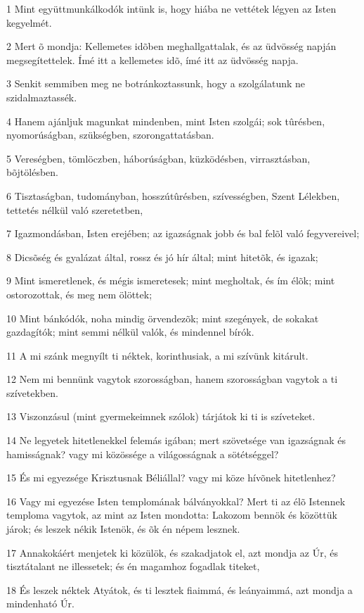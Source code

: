 \par 1 Mint együttmunkálkodók intünk  is, hogy hiába ne vettétek légyen az Isten kegyelmét.
\par 2 Mert õ mondja: Kellemetes idõben meghallgattalak, és az üdvösség napján megsegítettelek. Ímé itt a kellemetes idõ, ímé itt az üdvösség napja.
\par 3 Senkit semmiben meg ne botránkoztassunk, hogy a szolgálatunk ne szidalmaztassék.
\par 4 Hanem ajánljuk magunkat mindenben, mint Isten szolgái;  sok tûrésben, nyomorúságban, szükségben, szorongattatásban.
\par 5 Vereségben, tömlöczben, háborúságban, küzködésben, virrasztásban, bõjtölésben.
\par 6 Tisztaságban, tudományban, hosszútûrésben, szívességben, Szent Lélekben, tettetés nélkül való szeretetben,
\par 7 Igazmondásban, Isten erejében; az  igazságnak jobb és bal felõl való fegyvereivel;
\par 8 Dicsõség és gyalázat által, rossz és jó hír által; mint hitetõk, és igazak;
\par 9 Mint ismeretlenek, és mégis ismeretesek; mint megholtak, és ím élõk; mint ostorozottak,  és meg nem ölöttek;
\par 10 Mint bánkódók, noha mindig örvendezõk; mint szegények, de sokakat gazdagítók; mint semmi nélkül valók, és mindennel  bírók.
\par 11 A mi szánk megnyílt ti néktek, korinthusiak, a mi szívünk kitárult.
\par 12 Nem mi bennünk vagytok szorosságban, hanem szorosságban vagytok a ti szívetekben.
\par 13 Viszonzásul (mint gyermekeimnek szólok) tárjátok ki ti is szíveteket.
\par 14 Ne legyetek hitetlenekkel felemás igában; mert szövetsége  van igazságnak és hamisságnak? vagy mi közössége a világosságnak a sötétséggel?
\par 15 És mi egyezsége Krisztusnak Béliállal? vagy mi köze hívõnek  hitetlenhez?
\par 16 Vagy mi egyezése Isten templomának bálványokkal? Mert ti az élõ Istennek temploma vagytok, az mint az Isten mondotta: Lakozom  bennök és közöttük járok; és leszek nékik Istenök, és õk én népem lesznek.
\par 17 Annakokáért menjetek ki közülök, és szakadjatok el, azt mondja az Úr, és tisztátalant ne illessetek; és én magamhoz fogadlak titeket,
\par 18 És leszek néktek Atyátok, és ti lesztek fiaimmá, és leányaimmá, azt mondja a mindenható Úr.

